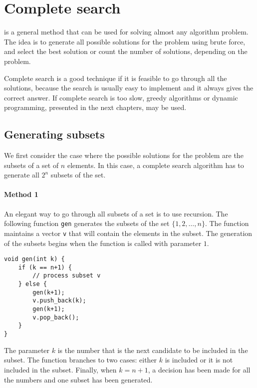\chapter{Complete search}

is a general method that can be used
for solving almost any algorithm problem.
The idea is to generate all possible
solutions for the problem using brute force,
and select the best solution or count the
number of solutions, depending on the problem.

Complete search is a good technique
if it is feasible to go through all the solutions,
because the search is usually easy to implement
and it always gives the correct answer.
If complete search is too slow,
greedy algorithms or dynamic programming,
presented in the next chapters,
may be used.

\section{Generating subsets}


We first consider the case where
the possible solutions for the problem
are the subsets of a set of $n$ elements.
In this case, a complete search algorithm
has to generate
all $2^n$ subsets of the set.

\subsubsection{Method 1}

An elegant way to go through all subsets
of a set is to use recursion.
The following function \texttt{gen}
generates the subsets of the set
$\{1,2,\ldots,n\}$.
The function maintains a vector \texttt{v}
that will contain the elements in the subset.
The generation of the subsets
begins when the function
is called with parameter $1$.

\begin{lstlisting}
void gen(int k) {
    if (k == n+1) {
        // process subset v
    } else {
        gen(k+1);
        v.push_back(k);
        gen(k+1);
        v.pop_back();
    }
}
\end{lstlisting}

The parameter $k$ is the number that is the next
candidate to be included in the subset.
The function branches to two cases:
either $k$ is included or it is not included in the subset.
Finally, when $k=n+1$, a decision has been made for
all the numbers and one subset has been generated.

